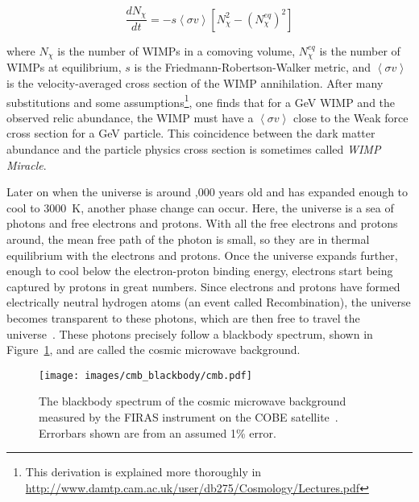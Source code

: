     \begin{equation}\label{eqn:boltz_dm}
      \frac{dN_\chi}{dt} = -s \left \langle \sigma v \right \rangle \left [ N_\chi^2 - \left ( N_\chi^{eq} \right )^2 \right ]
    \end{equation}
    
    where $N_\chi$ is the number of WIMPs in a comoving volume, $N_\chi^{eq}$ is the number of WIMPs at equilibrium, $s$ is the Friedmann-Robertson-Walker metric, and $\left \langle \sigma v \right \rangle$ is the velocity-averaged cross section of the WIMP annihilation.
    After many substitutions and some assumptions\footnote{This derivation is explained more thoroughly in \url{http://www.damtp.cam.ac.uk/user/db275/Cosmology/Lectures.pdf}}, one finds that for a \nicetilde{}GeV WIMP and the observed relic abundance, the WIMP must have a $\left \langle \sigma v \right \rangle$ close to the Weak force cross section for a \nicetilde{}GeV particle.
    This coincidence between the dark matter abundance and the particle physics cross section is sometimes called \textit{WIMP Miracle}.
    
    
    Later on when the universe is around ,000 years old and has expanded enough to cool to \nicetilde\SI{3000}{K}, another phase change can occur.
    Here, the universe is a sea of photons and free electrons and protons.
    With all the free electrons and protons around, the mean free path of the photon is small, so they are in thermal equilibrium with the electrons and protons.
    Once the universe expands further, enough to cool below the electron-proton binding energy, electrons start being captured by protons in great numbers.
    Since electrons and protons have formed electrically neutral hydrogen atoms (an event called Recombination), the universe becomes transparent to these photons, which are then free to travel the universe~\cite{planck2015,theEarlyUniverse,CMBFundamentals,CMBFlat}.
    These photons precisely follow a blackbody spectrum, shown in Figure~\ref{fig:cmb_black}, and are called the cosmic microwave background.
    
    \begin{figure}[ht]
      \centering
      \texttt{[image: images/cmb\_blackbody/cmb.pdf]}
      \caption[Cosmic Microwave Background Blackbody]{
        The blackbody spectrum of the cosmic microwave background measured by the FIRAS instrument on the COBE satellite~\cite{mather1990}.
        Errorbars shown are from an assumed 1\% error.
      }
      \label{fig:cmb_black}
    \end{figure}
    
